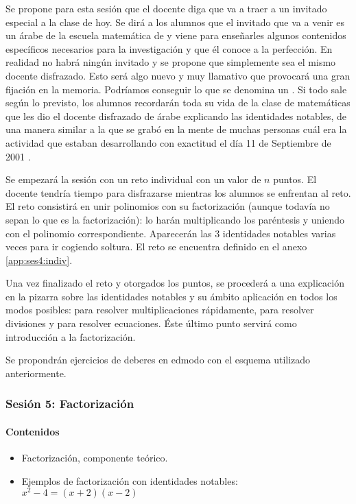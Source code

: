 Se propone para esta sesión que el docente diga que va a traer a un invitado especial a la clase de hoy.
%
Se dirá a los alumnos que el invitado que va a venir es un árabe de la escuela matemática de \arab y viene para enseñarles algunos contenidos específicos necesarios para la investigación y que él conoce a la perfección.
%
En realidad no habrá ningún invitado y se propone que simplemente sea el mismo docente disfrazado.
%
Esto será algo nuevo y muy llamativo que provocará una gran fijación en la memoria.
%
Podríamos conseguir lo que se denomina un .
%
Si todo sale según lo previsto, los alumnos recordarán toda su vida de la clase de matemáticas que les dio el docente disfrazado de árabe explicando las identidades notables, 
%
de una manera similar a la que se grabó en la mente de muchas personas cuál era la actividad que estaban desarrollando con exactitud el día 11 de Septiembre de 2001 \cite{11s}.

Se empezará la sesión con un reto individual con un valor de $n$ puntos.
%
El docente tendría tiempo para disfrazarse mientras los alumnos se enfrentan al reto.
%
El reto consistirá en unir polinomios con su factorización (aunque todavía no sepan lo que es la factorización): lo harán multiplicando los paréntesis y uniendo con el polinomio correspondiente.
%
Aparecerán las 3 identidades notables varias veces para ir cogiendo soltura.
%
El reto se encuentra definido en el anexo \ref{app:ses4:indiv}.

Una vez finalizado el reto y otorgados los puntos, se procederá a una explicación en la pizarra sobre las identidades notables y su ámbito aplicación en todos los modos posibles:
%
para resolver multiplicaciones rápidamente, para resolver divisiones y para resolver ecuaciones.
%
Éste último punto servirá como introducción a la factorización.


Se propondrán ejercicios de deberes en edmodo con el esquema utilizado anteriormente.


\subsubsection{Sesión 5: Factorización}


\paragraph{Contenidos}
\begin{itemize}
	\item Factorización, componente teórico.
	\item Ejemplos de factorización con identidades notables: $x^2-4 = (x+2)(x-2)$
\end{itemize}

